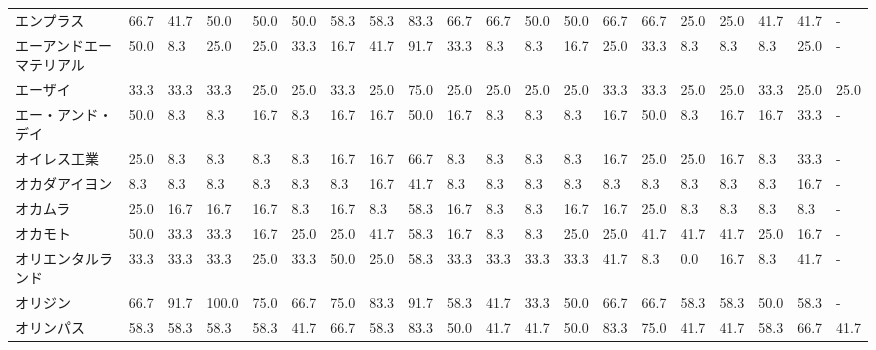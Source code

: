 \begin{tabular}{llllllllllllllllllll}
エンプラス           &   66.7 &   41.7 &      50.0 &      50.0 &       50.0 &   58.3 &   58.3 &   83.3 &    66.7 &    66.7 &   50.0 &  50.0 &   66.7 &    66.7 &    25.0 &  25.0 &  41.7 &  41.7 &     - \\
エーアンドエーマテリアル    &   50.0 &    8.3 &      25.0 &      25.0 &       33.3 &   16.7 &   41.7 &   91.7 &    33.3 &     8.3 &    8.3 &  16.7 &   25.0 &    33.3 &     8.3 &   8.3 &   8.3 &  25.0 &     - \\
エーザイ            &   33.3 &   33.3 &      33.3 &      25.0 &       25.0 &   33.3 &   25.0 &   75.0 &    25.0 &    25.0 &   25.0 &  25.0 &   33.3 &    33.3 &    25.0 &  25.0 &  33.3 &  25.0 &  25.0 \\
エー・アンド・デイ       &   50.0 &    8.3 &       8.3 &      16.7 &        8.3 &   16.7 &   16.7 &   50.0 &    16.7 &     8.3 &    8.3 &   8.3 &   16.7 &    50.0 &     8.3 &  16.7 &  16.7 &  33.3 &     - \\
オイレス工業          &   25.0 &    8.3 &       8.3 &       8.3 &        8.3 &   16.7 &   16.7 &   66.7 &     8.3 &     8.3 &    8.3 &   8.3 &   16.7 &    25.0 &    25.0 &  16.7 &   8.3 &  33.3 &     - \\
オカダアイヨン         &    8.3 &    8.3 &       8.3 &       8.3 &        8.3 &    8.3 &   16.7 &   41.7 &     8.3 &     8.3 &    8.3 &   8.3 &    8.3 &     8.3 &     8.3 &   8.3 &   8.3 &  16.7 &     - \\
オカムラ            &   25.0 &   16.7 &      16.7 &      16.7 &        8.3 &   16.7 &    8.3 &   58.3 &    16.7 &     8.3 &    8.3 &  16.7 &   16.7 &    25.0 &     8.3 &   8.3 &   8.3 &   8.3 &     - \\
オカモト            &   50.0 &   33.3 &      33.3 &      16.7 &       25.0 &   25.0 &   41.7 &   58.3 &    16.7 &     8.3 &    8.3 &  25.0 &   25.0 &    41.7 &    41.7 &  41.7 &  25.0 &  16.7 &     - \\
オリエンタルランド       &   33.3 &   33.3 &      33.3 &      25.0 &       33.3 &   50.0 &   25.0 &   58.3 &    33.3 &    33.3 &   33.3 &  33.3 &   41.7 &     8.3 &     0.0 &  16.7 &   8.3 &  41.7 &     - \\
オリジン            &   66.7 &   91.7 &     100.0 &      75.0 &       66.7 &   75.0 &   83.3 &   91.7 &    58.3 &    41.7 &   33.3 &  50.0 &   66.7 &    66.7 &    58.3 &  58.3 &  50.0 &  58.3 &     - \\
オリンパス           &   58.3 &   58.3 &      58.3 &      58.3 &       41.7 &   66.7 &   58.3 &   83.3 &    50.0 &    41.7 &   41.7 &  50.0 &   83.3 &    75.0 &    41.7 &  41.7 &  58.3 &  66.7 &  41.7 \\

\end{tabular}
